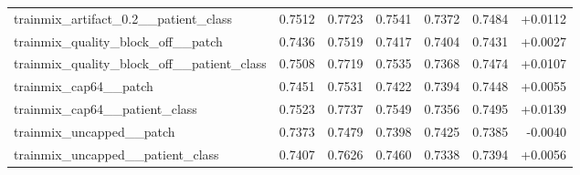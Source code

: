 \begin{table}[t]
\begin{tabular}{lrrrrrr}
trainmix\_artifact\_0.2\_\_patient\_class & 0.7512 & 0.7723 & 0.7541 & 0.7372 & 0.7484 & +0.0112 \\
trainmix\_quality\_block\_off\_\_patch & 0.7436 & 0.7519 & 0.7417 & 0.7404 & 0.7431 & +0.0027 \\
trainmix\_quality\_block\_off\_\_patient\_class & 0.7508 & 0.7719 & 0.7535 & 0.7368 & 0.7474 & +0.0107 \\
trainmix\_cap64\_\_patch & 0.7451 & 0.7531 & 0.7422 & 0.7394 & 0.7448 & +0.0055 \\
trainmix\_cap64\_\_patient\_class & 0.7523 & 0.7737 & 0.7549 & 0.7356 & 0.7495 & +0.0139 \\
trainmix\_uncapped\_\_patch & 0.7373 & 0.7479 & 0.7398 & 0.7425 & 0.7385 & -0.0040 \\
trainmix\_uncapped\_\_patient\_class & 0.7407 & 0.7626 & 0.7460 & 0.7338 & 0.7394 & +0.0056 \\
\hline
\end{tabular}
\end{table}
